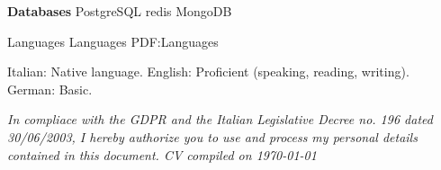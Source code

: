 \documentclass[a4paper,MMMyyyy,nonstopmode]{simpleresumecv}
\newcommand{\CVNote}{In compliace with the GDPR and the Italian Legislative Decree no. 196 dated 30/06/2003, I hereby authorize you to use and process my personal details contained in this document. CV compiled on {\today}}
\newcommand{\DoubleBigGap}{\BigGap\BigGap}
\begin{document}
\begin{Body}
      \BigGap

      \Entry
        \textbf{Databases}
        \Gap
        \BulletItem
          PostgreSQL
        \BulletItem
          redis
        \BulletItem
          MongoDB


    \Section
    {Languages}
    {Languages}
    {PDF:Languages}

      \Entry
        Italian: Native language.
      \Gap
      \Entry
        English: Proficient (speaking, reading, writing).
      \Gap
      \Entry
        German: Basic.

  \end{Body}

  \DoubleBigGap
  \UseNoteFont
  \null
  \textit{\CVNote}
\end{document}

